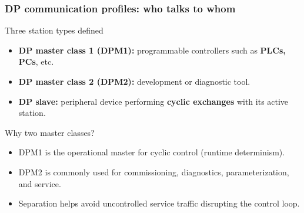 \begin{frame}
	\frametitle{DP communication profiles: who talks to whom}
	\justifying
	\begin{block}{Three station types defined}
		\begin{itemize}
			\item \textbf{DP master class 1 (DPM1):} programmable controllers such as \textbf{PLCs, PCs}, etc.
			\item \textbf{DP master class 2 (DPM2):} development or diagnostic tool.
			\item \textbf{DP slave:} peripheral device performing \textbf{cyclic exchanges} with its active station.
		\end{itemize}
	\end{block}
	\begin{block}{Why two master classes?}
		\begin{itemize}
			\item DPM1 is the operational master for cyclic control (runtime determinism).
			\item DPM2 is commonly used for commissioning, diagnostics, parameterization, and service.
			\item Separation helps avoid uncontrolled service traffic disrupting the control loop.
		\end{itemize}
	\end{block}
\end{frame}

